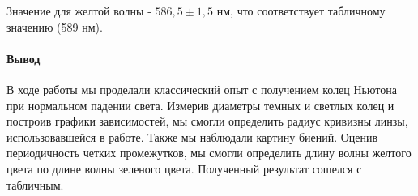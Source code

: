 \documentclass[12pt]{article}
\begin{document}
		Значение для желтой волны - $586,5 \pm 1,5$ нм, что соответствует табличному значению (589 нм).
		
		\paragraph{Вывод}
		
		В ходе работы мы проделали классический опыт с получением колец Ньютона при нормальном падении света.
		Измерив диаметры темных и светлых колец и построив графики зависимостей, мы смогли определить радиус кривизны линзы, использовавшейся в работе. Также мы наблюдали картину биений. Оценив периодичность четких промежутков, мы смогли определить длину волны желтого цвета по длине волны зеленого цвета. Полученный результат сошелся с табличным.
	
\end{document}
